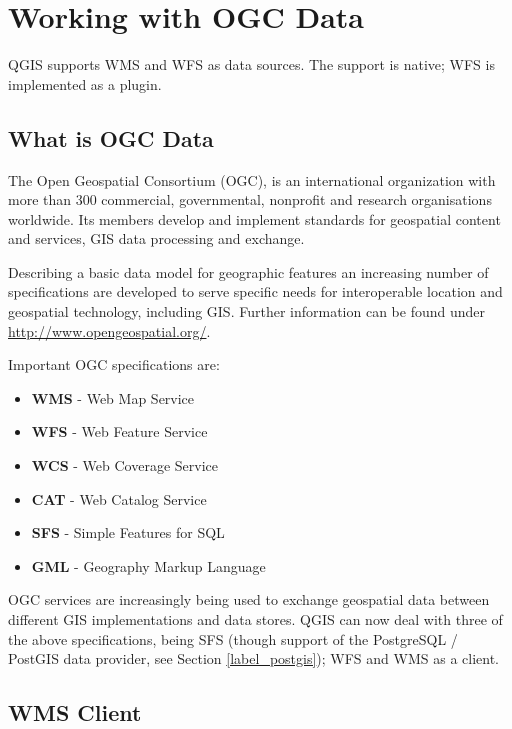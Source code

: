 
\section{Working with OGC Data}


QGIS supports WMS and WFS as data sources. The support is native; WFS is
implemented as a plugin.

\subsection{What is OGC Data}

The Open Geospatial Consortium (OGC), is an international organization with more than 300 
commercial, governmental, nonprofit and research organisations worldwide. Its members 
develop and implement standards for geospatial content and services, GIS data processing 
and exchange.

Describing a basic data model for geographic features an increasing number of specifications 
are developed to serve specific needs for interoperable location and geospatial technology, 
including GIS. Further information can be found under \url{http://www.opengeospatial.org/}.

Important OGC specifications are:

\begin{itemize}
\item \textbf{WMS} - Web Map Service
\item \textbf{WFS} - Web Feature Service
\item \textbf{WCS} - Web Coverage Service
\item \textbf{CAT} - Web Catalog Service
\item \textbf{SFS} - Simple Features for SQL
\item \textbf{GML} - Geography Markup Language
\end{itemize}

OGC services are increasingly being used to exchange geospatial data between
different GIS implementations and data stores.  QGIS can now deal with three of the
above specifications, being SFS (though support of the PostgreSQL / PostGIS
data provider, see Section \ref{label_postgis}); WFS and WMS as a client.

\subsection{WMS Client}\label{sec:ogc-wms}


